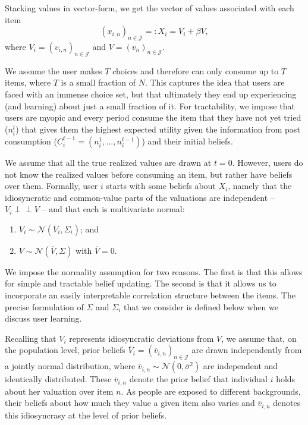 \documentclass[sigconf]{acmart}
\newcommand{\xhdr}[1]{\vspace{1mm} \noindent{\bf #1}}
\begin{document}
Stacking values in vector-form, we get the vector of values associated with each item 
$${\left(x_{i,n}\right)}_{n \in \mathcal{J}}=:X_i =V_i+ \beta V, $$
where $V_i ={\left(v_{i,n}\right)}_{n \in \mathcal{J}}$ and $V={\left(v_{n}\right)}_{n \in \mathcal{J}}$.


\xhdr{User Decision-Making.}
We assume the user makes $T$ choices and therefore can only consume up to $T$ items, where $T$ is a small fraction of $N$. This captures the idea that users are faced with an immense choice set, but that ultimately they end up experiencing (and learning) about just a small fraction of it. For tractability, we impose that users are myopic and every period consume the item that they have not yet tried ($n_i^t$) that gives them the highest expected utility given the information from past consumption ($C_i^{t-1}=(n_i^1,...,n_i^{t-1})$) and their initial beliefs.


\xhdr{User Beliefs.} We assume that all the true realized values are drawn at $t = 0$. However, users do not know the realized values before consuming an item, but rather have beliefs over them.
Formally, user $i$ starts with some beliefs about $X_i$, namely that the idiosyncratic and common-value parts of the valuations are independent -- $V_i \perp \!\!\! \perp V$ -- and that each is multivariate normal: 
\begin{enumerate}[topsep=0pt]
\item $V_i \sim \mathcal N (\overline V_i, \Sigma_i)$; and 
\item $V \sim \mathcal N(\overline V, \Sigma)$ with $\overline V =0$.
\end{enumerate}
We impose the normality assumption for two reasons. The first is that this allows for simple and tractable belief updating. The second is that it allows us to incorporate an easily interpretable correlation structure between the items. The precise formulation of $\Sigma$ and $\Sigma_i$ that we consider is defined below when we discuss user learning.


Recalling that $V_i$ represents idiosyncratic deviations from $V$, we assume that, on the population level, prior beliefs $\overline V_i=\left(\overline v_{i,n}\right)_{n \in \mathcal{J}}$ are drawn independently from a jointly normal distribution, where $\overline v_{i,n} \sim \mathcal N (0, \overline \sigma^2)$ are independent and identically distributed. These $\overline v_{i,n}$ denote the prior belief that individual $i$ holds about her valuation over item $n$. As people are exposed to different backgrounds, their beliefs about how much they value a given item also varies and $\overline v_{i,n}$ denotes this idiosyncrasy at the level of prior beliefs.
\end{document}
